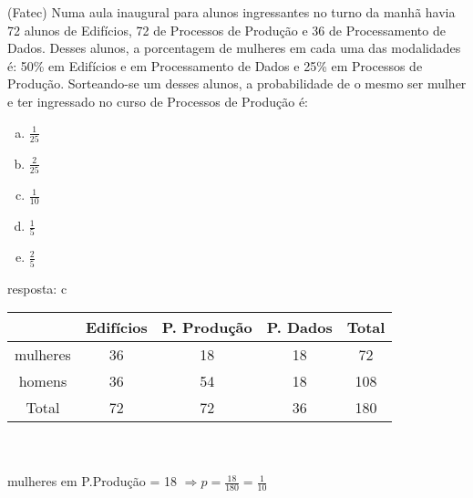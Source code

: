 \begin{ex}
 (Fatec) Numa  aula inaugural para alunos ingressantes no turno da manhã havia 72 alunos de Edifícios, 72 de Processos de Produção e 36 de Processamento de Dados. Desses alunos, a porcentagem de mulheres em cada uma das modalidades é: 50\% em Edifícios e em Processamento de Dados e 25\% em Processos de Produção. Sorteando-se um desses alunos, a probabilidade de o mesmo ser mulher e ter ingressado no curso de Processos de Produção é:
    \begin{enumerate}[(a)]
    \item $\frac{1}{25}$
    \item $\frac{2}{25}$
    \item $\frac{1}{10}$
    \item $\frac{1}{5}$
    \item $\frac{2}{5}$
    \end{enumerate}
      \begin{sol}
       resposta: c \\
    
            \begin{tabular}{|c|c|c|c|c|}     \hline            
              &  Edifícios & P. Produção& P. Dados & Total \\  \hline
     mulheres&  36   &   18   &  18  &  72 \\   \hline 
     homens  &  36   &   54   &  18  & 108 \\   \hline
     Total   &  72   &   72   &  36  & 180  \\  \hline
            \end{tabular}
            \\ \\
        mulheres em P.Produção = 18 $\Longrightarrow p=\frac{18}{180}=\frac{1}{10}$
    
      \end{sol}
\end{ex}